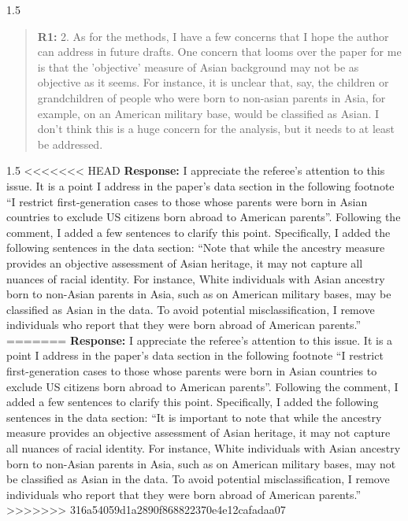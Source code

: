 \documentclass[12pt,english]{article}
\newcommand{\rrxspc}{1.5}
\begin{document}
\begin{refsection}
    \begin{spacing}{\rrxspc}
    \begin{quotation}
        \textbf{R1: } 2. As for the methods, I have a few concerns that I hope the author can address in future drafts. One concern that looms over the paper for me is that the 'objective' measure of Asian background may not be as objective as it seems. For instance, it is unclear that, say, the children or grandchildren of people who were born to non-asian parents in Asia, for example, on an American military base, would be classified as Asian. I don't think this is a huge concern for the analysis, but it needs to at least be addressed.
        \end{quotation}
        \end{spacing}
        
    \begin{spacing}{\rrxspc}
<<<<<<< HEAD
        \textbf{Response:} I appreciate the referee's attention to this issue. It is a point I address in the paper's data section in the following footnote ``I restrict first-generation cases to those whose parents were born in Asian countries to exclude US citizens born abroad to American parents''. Following the comment, I added a few sentences to clarify this point. Specifically, I added the following sentences in the data section: ``Note that while the ancestry measure provides an objective assessment of Asian heritage, it may not capture all nuances of racial identity. For instance, White individuals with Asian ancestry born to non-Asian parents in Asia, such as on American military bases, may be classified as Asian in the data. To avoid potential misclassification, I remove individuals who report that they were born abroad of American parents.''
=======
        \textbf{Response:} I appreciate the referee's attention to this issue. It is a point I address in the paper's data section in the following footnote ``I restrict first-generation cases to those whose parents were born in Asian countries to exclude US citizens born abroad to American parents''. Following the comment, I added a few sentences to clarify this point. Specifically, I added the following sentences in the data section: ``It is important to note that while the ancestry measure provides an objective assessment of Asian heritage, it may not capture all nuances of racial identity. For instance, White individuals with Asian ancestry born to non-Asian parents in Asia, such as on American military bases, may not be classified as Asian in the data. To avoid potential misclassification, I remove individuals who report that they were born abroad of American parents.''
>>>>>>> 316a54059d1a2890f868822370e4e12cafadaa07
    \end{spacing}    


\end{refsection}
\end{document}
